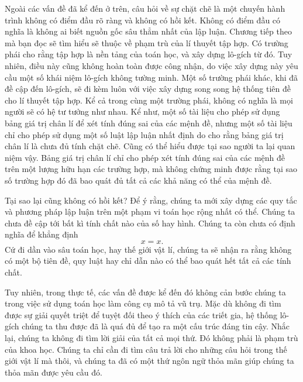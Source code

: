 Ngoài các vấn đề đã kể đến ở trên, câu hỏi về sự chặt chẽ là một chuyến hành trình không có điểm đầu rõ ràng và không có hồi kết. Không có điểm đầu có nghĩa là không ai biết nguồn gốc sâu thẳm nhất của lập luận. Chương tiếp theo mà bạn đọc sẽ tìm hiểu sẽ thuộc về phạm trù của lí thuyết tập hợp. Có trường phái cho rằng tập hợp là nền tảng của toán học, và xây dựng lô-gích từ đó. Tuy nhiên, điều này cũng không hoàn toàn được công nhận, do việc xây dựng này yêu cầu một số khái niệm lô-gích không tường minh. Một số trường phái khác, khi đã đề cập đến lô-gích, sẽ đi kèm luôn với việc xây dựng song song hệ thống tiên đề cho lí thuyết tập hợp. Kể cả trong cùng một trường phái, không có nghĩa là mọi người sẽ có hệ tư tưởng như nhau. Kể như, một số tài liệu cho phép sử dụng bảng giá trị chân lí để xét tính đúng sai của các mệnh đề, nhưng một số tài liệu chỉ cho phép sử dụng một số luật lập luận nhất định do cho rằng bảng giá trị chân lí là chưa đủ tính chặt chẽ. Cũng có thể hiểu được tại sao người ta lại quan niệm vậy. Bảng giá trị chân lí chỉ cho phép xét tính đúng sai của các mệnh đề trên một lượng hữu hạn các trường hợp, mà không chứng minh được rằng tại sao số trường hợp đó đã bao quát đủ tất cả các khả năng có thể của mệnh đề.

Tại sao lại cũng không có hồi kết? Để ý rằng, chúng ta mới xây dựng các quy tắc và phương pháp lập luận trên một phạm vi toán học rộng nhất có thể. Chúng ta chưa đề cập tới bất kì tính chất nào của số hay hình. Chúng ta còn chưa có định nghĩa để khẳng định $$x = x.$$
Cứ đi dần vào sâu toán học, hay thế giới vật lí, chúng ta sẽ nhận ra rằng không có một bộ tiên đề, quy luật hay chỉ dẫn nào có thể bao quát hết tất cả các tính chất.

Tuy nhiên, trong thực tế, các vấn đề được kể đến đó không cản bước chúng ta trong việc sử dụng toán học làm công cụ mô tả vũ trụ. Mặc dù không đi tìm được sự giải quyết triệt để tuyệt đối theo ý thích của các triết gia, hệ thống lô-gích chúng ta thu được đã là quá đủ để tạo ra một cấu trúc đáng tin cậy. Nhắc lại, chúng ta không đi tìm lời giải của tất cả mọi thứ. Đó không phải là phạm trù của khoa học. Chúng ta chỉ cần đi tìm câu trả lời cho những câu hỏi trong thế giới vật lí mà thôi, và chúng ta đã có một thứ ngôn ngữ thỏa mãn giúp chúng ta thỏa mãn được yêu cầu đó.